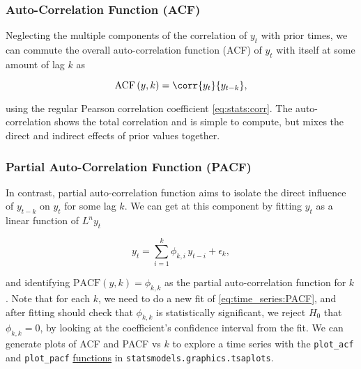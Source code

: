 \subsubsection{Auto-Correlation Function (ACF)}
\label{additional:time_series:ACF}

Neglecting the multiple components of the correlation of $y_{t}$ with prior times,
we can commute the overall auto-correlation function (ACF) of $y_{t}$
with itself at some amount of lag $k$ as

\begin{equation}\label{eq:time_series:ACF}
\text{ACF}\left(y,k\right) = \corr{y_{t}}{y_{t-k}},
\end{equation}

\noindent using the regular Pearson correlation coefficient \cref{eq:stats:corr}.
The auto-correlation shows the total correlation and is simple to compute,
but mixes the direct and indirect effects of prior values together.

\subsubsection{Partial Auto-Correlation Function (PACF)}
\label{additional:time_series:PACF}

In contrast, partial auto-correlation function
aims to isolate the direct influence of $y_{t-k}$ on $y_{t}$ for some lag $k$.
We can get at this component by fitting $y_{t}$ as a linear function of $L^{n} y_{t}$

\begin{equation}\label{eq:time_series:PACF}
y_{t} = \sum_{i=1}^{k} \phi_{k,i}\, y_{t-i} + \epsilon_{k},
\end{equation}

\noindent and identifying $\text{PACF}\left(y,k\right) = \phi_{k,k}$
as the partial auto-correlation function for $k$.
Note that for each $k$, we need to do a new fit of \cref{eq:time_series:PACF},
and after fitting should check that $\phi_{k,k}$ is statistically significant,
\ie we reject $H_{0}$ that $\phi_{k,k}=0$, by looking at the coefficient's confidence interval from the fit.
We can generate plots of ACF and PACF vs $k$ to explore a time series
with the \texttt{plot\_acf} and \texttt{plot\_pacf}
\href{https://www.statsmodels.org/stable/graphics.html}{functions} in \texttt{statsmodels.graphics.tsaplots}.


